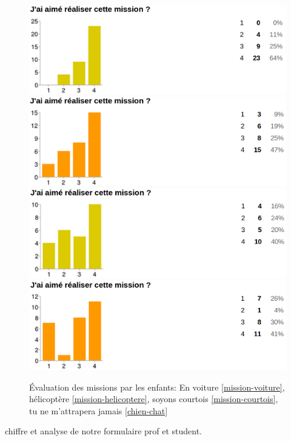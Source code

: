 \begin{figure}[ht]
  \begin{center}
    \includegraphics[scale=0.3]{content/8-validation/images/voiture}
    \includegraphics[scale=0.3]{content/8-validation/images/helico}
    \includegraphics[scale=0.3]{content/8-validation/images/courtois}
    \includegraphics[scale=0.3]{content/8-validation/images/chien}
    \caption{Évaluation des missions par les enfants: En voiture \ref{mission-voiture}, hélicoptère \ref{mission-helicoptere}, soyons courtois \ref{mission-courtois}, tu ne m'attrapera jamais \ref{chien-chat}}
    \label{fig:evaluation-mission}
  \end{center}
\end{figure}







chiffre et analyse de notre formulaire prof et student.















